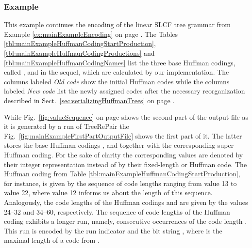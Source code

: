 \documentclass[12pt]{llncs}
\newcommand{\trp}{\mbox{TreeRePair}\xspace}
\begin{document}
\subsubsection{Example}\label{sec:mainExampleHuffman}

This example continues the encoding of the linear SLCF tree grammar  from Example \ref{ex:mainExampleEncoding} on page \pageref{ex:mainExampleEncoding}. The Tables \ref{tbl:mainExampleHuffmanCodingStartProduction}, \ref{tbl:mainExampleHuffmanCodingProductions} and \ref{tbl:mainExampleHuffmanCodingNames} list the three base Huffman codings, called ,  and  in the sequel, which are calculated by our implementation. The columns labeled \emph{Old code} show the initial Huffman codes while the columns labeled \emph{New code} list the newly assigned codes after the necessary reorganization described in Sect.~\ref{sec:serializingHuffmanTrees} on page \pageref{sec:serializingHuffmanTrees}.

While Fig.~\ref{fig:valueSequence} on page \pageref{fig:valueSequence} shows the second part of the output file as it is generated by a run of \trp the Fig.~\ref{fig:mainExampleFirstPartOutputFile} shows the first part of it. The latter stores the base Huffman codings ,  and  together with the corresponding super Huffman coding. For the sake of clarity the corresponding values are denoted by their integer representation instead of by their fixed-length or Huffman code. The Huffman coding  from Table \ref{tbl:mainExampleHuffmanCodingStartProduction}, for instance, is given by the sequence of code lengths ranging from value 13 to value 22, where value 12 informs us about the length of this sequence. Analogously, the code lengths of the Huffman codings  and  are given by the values 24--32 and 34--60, respectively. The sequence of code lengths of the Huffman coding  exhibits a longer run, namely,  consecutive occurrences of the code length . This run is encoded by the run indicator  and the bit string , where  is the maximal length of a code from .
\end{document}

